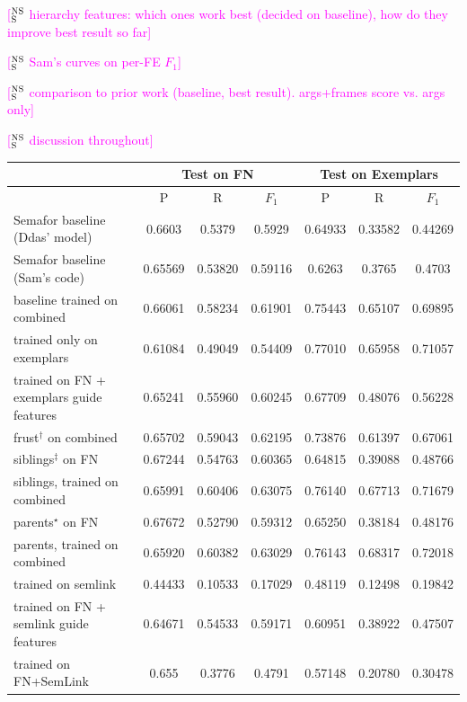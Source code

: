 \documentclass[11pt,a4paper]{article}
\newcommand{\ensuretext}[1]{#1}
\newcommand{\nssmarker}{\ensuretext{\textcolor{magenta}{\ensuremath{^{\textsc{NS}}_{\textsc{S}}}}}}
\newcommand{\arkcomment}[3]{\ensuretext{\textcolor{#3}{[#1 #2]}}}
\newcommand{\nss}[1]{\arkcomment{\nssmarker}{#1}{magenta}}
\begin{document}
\nss{hierarchy features: which ones work best (decided on baseline), how do they improve best result so far}

\nss{Sam's curves on per-FE $F_1$}

\nss{comparison to prior work (baseline, best result). args+frames score vs. args only}

\nss{discussion throughout}



\begin{table}
\begin{small}
\begin{tabular}{|l|c|c|c|c|c|c|}\hline
& \multicolumn{3}{c|}{\textbf{Test on FN}} & \multicolumn{3}{c|}{\textbf{Test on Exemplars}} \\ \hline
 & P & R & $F_1$ & P & R & $F_1$ \\ \hline
 Semafor baseline (Ddas' model) & 0.6603 & 0.5379 & 0.5929 & 0.64933 & 0.33582 & 0.44269 \\ \hline
 Semafor baseline (Sam's code) & 0.65569 & 0.53820 & 0.59116 & 0.6263 & 0.3765 & 0.4703 \\ \hline
 baseline trained on combined &  0.66061 & 0.58234 & 0.61901 & 0.75443 & 0.65107 & 0.69895 \\ \hline
 trained only on exemplars & 0.61084 & 0.49049 & 0.54409 & 0.77010 & 0.65958 & 0.71057 \\ \hline
 trained on FN + exemplars guide features & 0.65241 & 0.55960 & 0.60245 & 0.67709 & 0.48076 & 0.56228 \\ \hline
 frust$^\dagger$ on combined &  0.65702 & 0.59043 & 0.62195 & 0.73876 & 0.61397 & 0.67061\\ \hline
 siblings$^\ddagger$ on FN & 0.67244 & 0.54763 & 0.60365 &  0.64815 & 0.39088 & 0.48766 \\ \hline
 siblings, trained on combined &  0.65991 & 0.60406 & 0.63075 & 0.76140 & 0.67713 & 0.71679 \\ \hline
 parents$^\star$ on FN &  0.67672 & 0.52790 & 0.59312 & 0.65250 & 0.38184 & 0.48176 \\ \hline
 parents, trained on combined &  0.65920 & 0.60382 & 0.63029 & 0.76143 & 0.68317 & 0.72018 \\ \hline
 trained on semlink & 0.44433 & 0.10533 & 0.17029 & 0.48119 & 0.12498 & 0.19842 \\ \hline
 trained on FN + semlink guide features & 0.64671 & 0.54533 & 0.59171 & 0.60951 & 0.38922 & 0.47507 \\ \hline
 trained on FN+SemLink & 0.655 & 0.3776 & 0.4791 & 0.57148 & 0.20780 & 0.30478 \\ \hline

\end{tabular}
\end{small}
\end{table}
\end{document}
